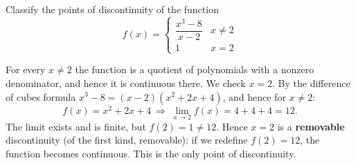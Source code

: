 
\begin{question}
Classify the points of discontinuity of the function
\[ f(x)=\begin{cases}\dfrac{x^3-8}{x-2} & x\neq 2\\[2mm] 1 & x=2\end{cases} \]
\end{question}

\begin{solution}
For every $x\neq 2$ the function is a quotient of polynomials with a nonzero denominator, and hence it is continuous there. We check $x=2$. By the difference of cubes formula $x^3-8=(x-2)(x^2+2x+4)$, and hence for $x\neq2$:
\[ f(x)=x^2+2x+4\ \Longrightarrow\ \lim_{x\to2}f(x)=4+4+4=12. \]
The limit exists and is finite, but $f(2)=1\neq 12$. Hence $x=2$ is a \textbf{removable} discontinuity (of the first kind, removable): if we redefine $f(2)=12$, the function becomes continuous. This is the only point of discontinuity.
\end{solution}
